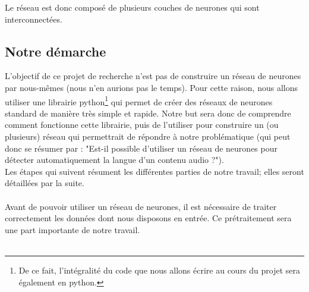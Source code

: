 \documentclass{article}
\begin{document}
\noindent Le réseau est donc composé de plusieurs couches de neurones qui sont interconnectées.\\  

\subsection{Notre démarche}

L'objectif de ce projet de recherche n'est pas de construire un réseau de neurones par nous-mêmes (nous n'en aurions pas le temps). Pour cette raison, nous allons utiliser une librairie python\footnote{De ce fait, l'intégralité du code que nous allons écrire au cours du projet sera également en python.} qui permet de créer des réseaux de neurones standard de manière très simple et rapide. Notre but sera donc de comprendre comment fonctionne cette librairie, puis de l'utiliser pour construire un (ou plusieurs) réseau qui permettrait de répondre à notre problématique (qui peut donc se résumer par : "Est-il possible d'utiliser un réseau de neurones pour détecter automatiquement la langue d'un contenu audio ?").\\
Les étapes qui suivent résument les différentes parties de notre travail; elles seront détaillées par la suite.\\
 \\
Avant de pouvoir utiliser un réseau de neurones, il est nécessaire de traiter correctement les données dont nous disposons en entrée. Ce prétraitement sera une part importante de notre travail.\\
 \\
\end{document}
